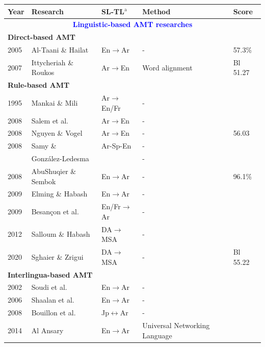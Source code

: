 \begin{small}
	\begin{longtable}{|l|l|l|l|l|}
		\hline
		Year & Research & SL-TL$^{\mathrm{a}}$ & Method & Score\\
		\hline
		\endhead
		
		\multicolumn{5}{c}{\textbf{\textcolor{blue}{Linguistic-based AMT researches}}}\\
		\multicolumn{5}{l}{\textbf{Direct-based AMT}}\\
		\hline
		2005 & Al-Taani \& Hailat \cite{altaani05}					& En$\rightarrow$Ar &-& 57.3\%\\
		2007 & Ittycheriah \& Roukos \cite{ittycheriah-roukos-07}	& Ar$\rightarrow$En &Word alignment& Bl 51.27\\
		\hline
		\multicolumn{5}{l}{\textbf{Rule-based AMT}}\\
		\hline
		1995 & Mankai \& Mili \cite{mankai95}				& Ar$\rightarrow$En/Fr &-&\\
		2008 & Salem et al. \cite{salem08} 					& Ar$\rightarrow$En &-&\\
		2008 & Nguyen \& Vogel \cite{nguyen08}				& Ar$\rightarrow$En &-& 56.03\\
		2008 & Samy	\& & Ar-Sp-En &-&\\
		 & Gonz{\'a}lez-Ledesma \cite{samy08}	&  &-&\\
		2008 & AbuShuqier \& Sembok \cite{abushquier08} 	& En$\rightarrow$Ar &-& 96.1\%\\
		2009 & Elming \& Habash \cite{elming09}				& En$\rightarrow$Ar &-&\\
		2009 & Besançon et al. \cite{besanccon09} 			& En/Fr$\rightarrow$Ar &-&\\
		2012 & Salloum \& Habash \cite{salloum12}			& DA$\rightarrow$MSA &-&\\
		2020 & Sghaier \& Zrigui \cite{sghaier20}			& DA$\rightarrow$MSA &-& Bl 55.22\\
		\hline
		\multicolumn{5}{l}{\textbf{Interlingua-based AMT}}\\
		\hline
		2002 & Soudi et al. \cite{soudi02}					& En$\rightarrow$Ar &-&\\
		2006 & Shaalan et al. \cite{shaalan06}				& En$\rightarrow$Ar &-&\\
		2008 & Bouillon et al. \cite{bouillon08}			& Jp$\leftrightarrow$Ar &-&\\
		2014 & Al Ansary \cite{AlAnsary14}					& En$\rightarrow$Ar &Universal Networking Language&\\
		\hline

\end{longtable}
\end{small}
